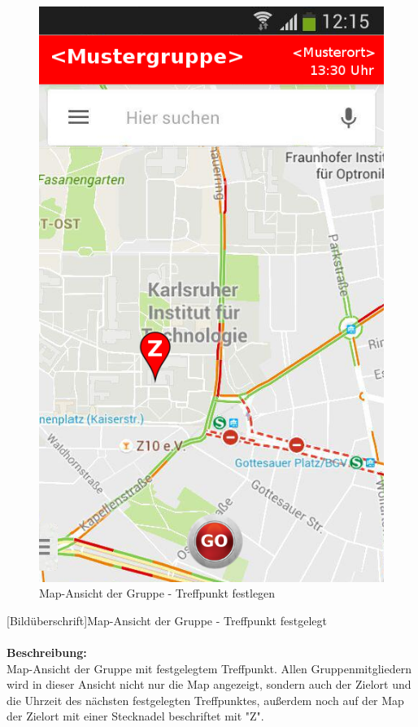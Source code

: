 \begin{figure}[H]
	\caption{Map-Ansicht der Gruppe - Treffpunkt festlegen}
	\includegraphics[scale =0.5]{resources/images/map.png}
\end{figure}
[Bildüberschrift]Map-Ansicht der Gruppe - Treffpunkt festgelegt\\ \\
\textbf{Beschreibung:}\\
Map-Ansicht der Gruppe mit festgelegtem Treffpunkt. Allen Gruppenmitgliedern wird in dieser Ansicht nicht nur die Map angezeigt, sondern auch der Zielort und die Uhrzeit des nächsten festgelegten Treffpunktes, außerdem noch auf der Map der Zielort mit einer Stecknadel beschriftet mit "Z".\\
